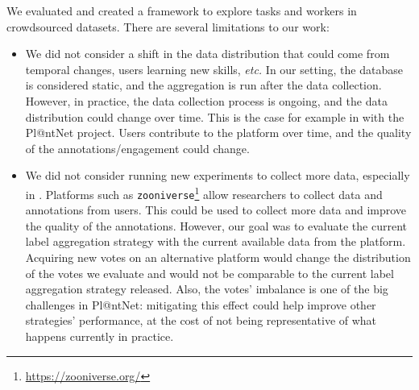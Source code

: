 We evaluated and created a framework to explore tasks and workers in crowdsourced datasets.
There are several limitations to our work:
\begin{itemize}
    \item We did not consider a shift in the data distribution that could come from temporal changes, users learning new skills, \emph{etc.} In our setting, the database is considered static, and the aggregation is run after the data collection. However, in practice, the data collection process is ongoing, and the data distribution could change over time.
    This is the case for example in  with the Pl@ntNet project. Users contribute to the platform over time, and the quality of the annotations/engagement could change.
    \item We did not consider running new experiments to collect more data, especially in . Platforms such as \texttt{zooniverse}\footnote{\url{https://zooniverse.org/}} allow researchers to collect data and annotations from users. This could be used to collect more data and improve the quality of the annotations. However, our goal was to evaluate the current label aggregation strategy with the current available data from the platform. Acquiring new votes on an alternative platform would change the distribution of the votes we evaluate and would not be comparable to the current label aggregation strategy released. Also, the votes' imbalance is one of the big challenges in Pl@ntNet: mitigating this effect could help improve other strategies' performance, at the cost of not being representative of what happens currently in practice.
\end{itemize}


